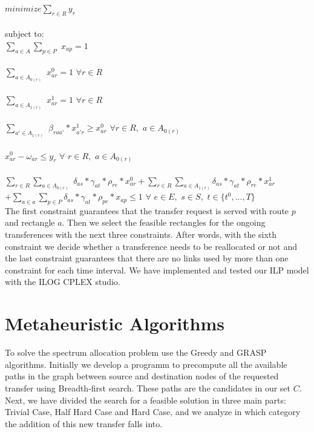 \documentclass[11pt,a4paper]{article}
\begin{document}
$minimize \sum_{r\in R} y_{r} $\\\\
subject to:\\
$\sum_{a \in A} \sum_{p \in P}$ $x_{ap} = 1$\\\\
$\sum_{a \in A_{0(r)}}$ $x^{0}_{ar}=1$    $\forall r \in R$\\\\
$\sum_{a \in A_{1(r)}}$ $x^{1}_{ar}=1$    $\forall r \in R$\\\\
$\sum_{a' \in A_{1(r)}}$ $\beta_{raa'}*x^{1}_{a'r} \geq x^{0}_{ar}$     $\forall r \in R,$ $a \in A_{0(r)}$\\\\
$x^{0}_{ar} - \omega_{ar} \leq y_{r}$     $\forall$ $r \in R,$ $a \in A_{0(r)}$\\\\
$\sum_{r \in R} \sum_{a \in A_{0(r)}}$ $\delta_{as} * \gamma_{at} * \rho_{re} * x^{0}_{ar} + \sum_{r \in R} \sum_{a \in A_{1(r)}} \delta_{as} * \gamma_{at} * \rho_{re} * x^{1}_{ar}$\\ 
$+ \sum_{a \in a} \sum_{p \in P} \delta_{as} * \gamma_{at} * \rho_{pe} * x_{ap} \leq 1$    $\forall$ $e \in E,$ $s \in S,$ $t \in {\{t^{0},...,T\}}$\\

The first constraint guarantees that the transfer request is served with route $p$ and rectangle $a$. Then we select the feasible rectangles for the ongoing transferences with the next three constraints. After words, with the sixth constraint we decide whether a transference needs to be reallocated or not and the last constraint guarantees that there are no links used by more than one constraint for each time interval. We have implemented and tested our ILP model with the ILOG CPLEX studio.

\section{Metaheuristic Algorithms}

To solve the spectrum allocation problem use the Greedy and GRASP algorithms. Initially we develop a programm to precompute all the available paths in the graph between source and destination nodes of the requested transfer using Breadth-first search. These paths are the candidates in our set $C$. Next, we have divided the search for a feasible solution in three main parts: Trivial Case, Half Hard Case and Hard Case, and we analyze in which category the addition of this new transfer falls into.\\
\end{document}
